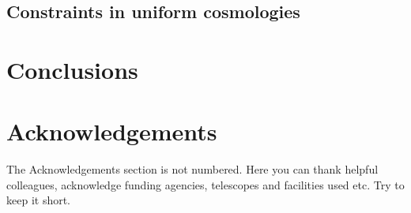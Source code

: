 \documentclass[fleqn,usenatbib]{mnras}
\begin{document}
\subsection{Constraints in uniform cosmologies}





\section{Conclusions}

\section*{Acknowledgements}

The Acknowledgements section is not numbered. Here you can thank helpful
colleagues, acknowledge funding agencies, telescopes and facilities used etc.
Try to keep it short.







\end{document}
